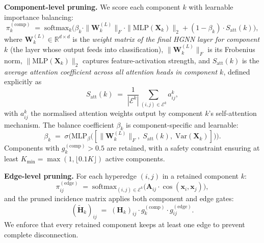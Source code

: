 \documentclass[10pt]{article}
\theoremstyle{plain}
\theoremstyle{definition}
\begin{document}
\textbf{Component-level pruning.} We score each component $k$ with learnable importance balancing: 
\begin{equation}
\pi_k^{(\mathrm{comp})} \;=\;
\mathrm{softmax}_k\!\Big(\beta_k\cdot
\|\mathbf{W}_k^{(L)}\|_F\cdot\|\mathrm{MLP}(\mathbf{X}_k)\|_2
+ (1-\beta_k)\cdot S_{\mathrm{att}}(k)\Big),
\label{eq:comp_importance}
\end{equation}
where $\mathbf{W}_k^{(L)}\in\mathbb{R}^{d\times d}$ is the \emph{weight matrix of the final HGNN layer for component $k$} (the layer whose output feeds into classification), $\|\mathbf{W}_k^{(L)}\|_F$ is its Frobenius norm, $\|\mathrm{MLP}(\mathbf{X}_k)\|_2$ captures feature-activation strength, and $S_{\mathrm{att}}(k)$ is the \emph{average attention coefficient across all attention heads in component $k$}, defined explicitly as
\begin{equation}
S_{\mathrm{att}}(k) \;=\;
\frac{1}{|\mathcal{E}^{k}|}
\sum_{(i,j)\in\mathcal{E}^{k}} a^{k}_{ij},
\label{eq:satt_def}
\end{equation}
with $a^{k}_{ij}$ the normalised attention weights output by component $k$'s self-attention mechanism. The balance coefficient $\beta_k$ is component-specific and learnable:
\begin{equation}
\beta_k \;=\;
\sigma\!\Big(\mathrm{MLP}_\beta\!\big([\|\mathbf{W}_k^{(L)}\|_F,\;
        S_{\mathrm{att}}(k),\;\mathrm{Var}(\mathbf{X}_k)]\big)\Big).
\label{eq:beta_learnable}
\end{equation}
Components with $g_k^{(\mathrm{comp})}\!>\!0.5$ are retained, with a safety constraint ensuring at least $K_{\min}=\max(1,\lfloor 0.1K\rfloor)$ active components.

\textbf{Edge-level pruning.} For each hyperedge $(i,j)$ in a retained component $k$:
\begin{equation}
\pi_{ij}^{(\mathrm{edge})} \;=\;
\mathrm{softmax}_{(i,j)\in\mathcal{E}^{k}}
\!\big(\mathbf{A}_{ij}\cdot\cos(\mathbf{x}_i,\mathbf{x}_j)\big),
\label{eq:edge_importance}
\end{equation}
and the pruned incidence matrix applies both component and edge gates:
\begin{equation}
(\widetilde{\mathbf{H}}_k)_{ij} \;=\;
(\mathbf{H}_k)_{ij}\cdot g_k^{(\mathrm{comp})}\cdot
g_{ij}^{(\mathrm{edge})}.
\label{eq:pruned_H}
\end{equation}
We enforce that every retained component keeps at least one edge to prevent complete disconnection.
\end{document}
